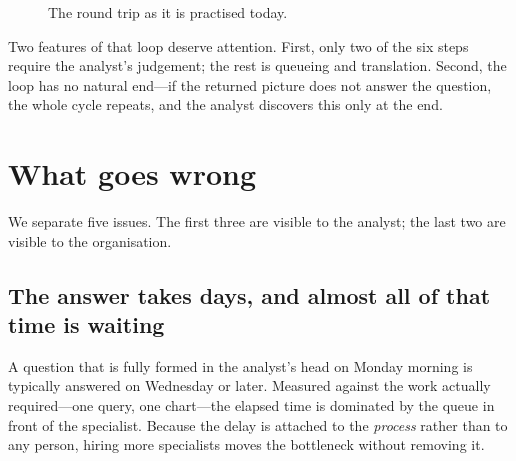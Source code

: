 \documentclass[12pt,a4paper]{report}
\begin{document}
\begin{figure}[H]
  \centering
  \caption{The round trip as it is practised today.}
  \label{fig:today}
\end{figure}

Two features of that loop deserve attention. First, only two of the six steps
require the analyst's judgement; the rest is queueing and translation. Second,
the loop has no natural end---if the returned picture does not answer the
question, the whole cycle repeats, and the analyst discovers this only at the
end.

\section{What goes wrong}

We separate five issues. The first three are visible to the analyst; the last
two are visible to the organisation.

\subsection{The answer takes days, and almost all of that time is waiting}

A question that is fully formed in the analyst's head on Monday morning is
typically answered on Wednesday or later. Measured against the work actually
required---one query, one chart---the elapsed time is dominated by the queue in
front of the specialist. Because the delay is attached to the \emph{process}
rather than to any person, hiring more specialists moves the bottleneck without
removing it.
\end{document}
